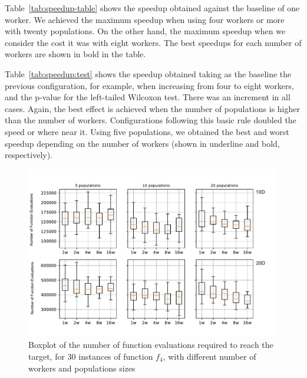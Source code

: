 \documentclass[review]{elsarticle}
\begin{document}
Table~\ref{tab:speedup-table} shows the speedup obtained against the baseline of
one worker. We achieved the maximum speedup when using four workers or more with
twenty populations. On the other hand, the maximum speedup when we consider the
cost it was with eight workers. The best speedups for each number of workers are
shown in bold in the table.  



Table~\ref{tab:speedup:test} shows the speedup obtained taking as the baseline
the previous configuration, for example, when increasing from four to eight
workers, and the p-value for the left-tailed Wilcoxon test. There was an
increment in all cases. Again, the best effect is achieved when the number of
populations is higher than the number of workers. Configurations following this
basic rule doubled the speed or where near it. Using five populations, we
obtained the best and worst speedup depending on the number of workers (shown in
underline and bold, respectively).

\begin{figure}[h!tbp]
  \centering
  \includegraphics[width=\textwidth]{evals_per_instance}
  \caption{Boxplot of the number of function evaluations required to reach the target, for 30 instances of function $f_4$, with different number of workers and populations sizes}
  \label{fig:evals_instance}
\end{figure}
\end{document}

